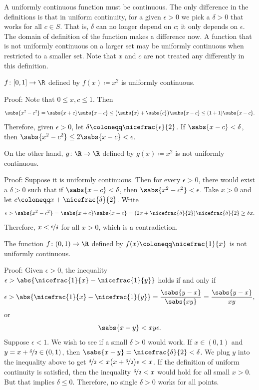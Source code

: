 A uniformly continuous function must be continuous.
The only difference in the definitions
is that in uniform continuity,
for a given $\epsilon > 0$ we pick a $\delta > 0$ that
works for all $c \in S$.  That is, $\delta$ can no longer depend on $c$;
it only depends on $\epsilon$.  The domain of definition
of the function makes a difference now.  A function that is not uniformly
continuous on a larger set may be uniformly continuous when restricted to a
smaller set.
Note that $x$ and $c$ are not treated any differently
in this definition.

\begin{example}
$f \colon [0,1] \to \R$ defined by $f(x) \coloneqq x^2$ is uniformly continuous.

Proof: Note that $0 \leq x,c \leq 1$.  Then
\begin{equation*}
\sabs{x^2-c^2} = \sabs{x+c}\sabs{x-c}
\leq \bigl(\sabs{x}+\sabs{c}\bigr) \sabs{x-c}
\leq (1+1)\sabs{x-c} .
\end{equation*}
Therefore, given $\epsilon > 0$, let $\delta \coloneqq \nicefrac{\epsilon}{2}$.
If $\sabs{x-c} < \delta$, then $\sabs{x^2-c^2} \leq 2 \sabs{x-c} < \epsilon$.

\medskip

On the other hand, $g \colon \R \to \R$ defined by $g(x) \coloneqq x^2$ is not uniformly
continuous.

Proof: Suppose it is uniformly continuous.
Then for every $\epsilon > 0$,
there would exist a $\delta > 0$ such that
if $\sabs{x-c} < \delta$, then $\sabs{x^2 -c^2} < \epsilon$.
Take $x > 0$ and let
$c \coloneqq x+\nicefrac{\delta}{2}$.  Write
\begin{equation*}
\epsilon >
\sabs{x^2-c^2} = \sabs{x+c}\sabs{x-c}
=
(2x+\nicefrac{\delta}{2})\nicefrac{\delta}{2} 
\geq 
\delta x .
\end{equation*}
Therefore, $x < \nicefrac{\epsilon}{\delta}$ for all $x > 0$, which is a
contradiction.
\end{example}


\begin{example}
The function $f \colon (0,1) \to \R$ defined by $f(x) \coloneqq \nicefrac{1}{x}$ is not
uniformly continuous.

Proof: Given $\epsilon > 0$, the inequality $\epsilon >
\abs{\nicefrac{1}{x}-\nicefrac{1}{y}}$ holds if and only if
\begin{equation*}
\epsilon >
\abs{\nicefrac{1}{x}-\nicefrac{1}{y}}
=
\frac{\sabs{y-x}}{\sabs{xy}} 
=
\frac{\sabs{y-x}}{xy} ,
\end{equation*}
or
\begin{equation*}
\sabs{x-y} < xy \epsilon .
\end{equation*}
Suppose $\epsilon < 1$.
We wish to see if a 
small $\delta > 0$ would work.
If $x \in (0,1)$ and 
$y = x+\nicefrac{\delta}{2} \in (0,1)$,
then $\sabs{x-y} = \nicefrac{\delta}{2} < \delta$.
We plug $y$ into the inequality above to get $\nicefrac{\delta}{2} <
x \bigl( x+\nicefrac{\delta}{2} \bigr) \epsilon < x$.
If the definition of uniform continuity is satisfied, then
the inequality $\nicefrac{\delta}{2} < x$ would hold for all small $x > 0$.
But that implies $\delta \leq 0$.
Therefore, no single $\delta > 0$ works for all points.
\end{example}

